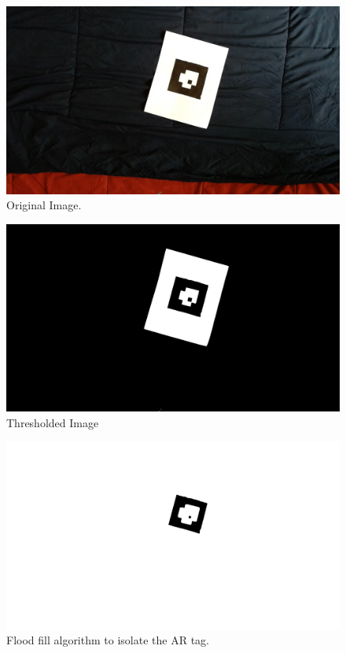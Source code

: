 \documentclass[11pt]{article}
\begin{document}
\begin{figure}[!htbp]
  \centering
	\includegraphics[width=1\textwidth]{frame15}
	\caption{Original Image.}
\end{figure}

\begin{figure}[!htbp]
  \centering
	\includegraphics[width=1\textwidth]{ThresholdedImage}
	\caption{Thresholded Image}
\end{figure}
\begin{figure}[!htbp]
  \centering
	\includegraphics[width=1\textwidth]{floodfill}
	\caption{Flood fill algorithm to isolate the AR tag.}
\end{figure}
\end{document}

